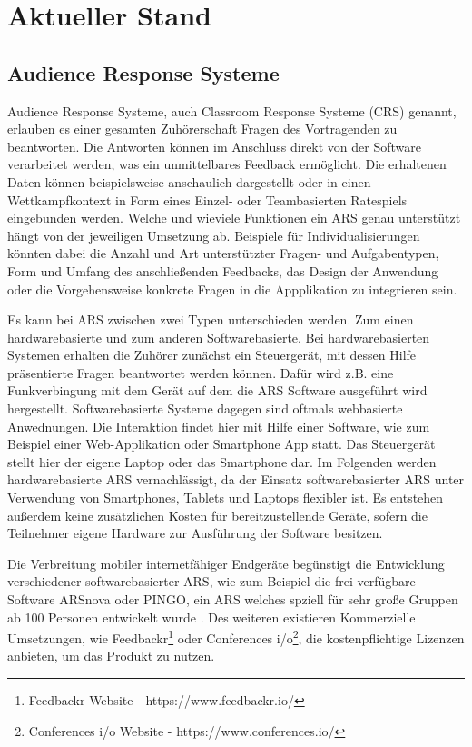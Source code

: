 \documentclass[conference]{IEEEtran}
\begin{document}
\section{Aktueller Stand}
\subsection{Audience Response Systeme}
Audience Response Systeme, auch Classroom Response Systeme (CRS) genannt, erlauben es einer gesamten Zuhörerschaft Fragen des Vortragenden zu beantworten. Die Antworten können im Anschluss direkt von der Software verarbeitet werden, was ein unmittelbares Feedback ermöglicht. Die erhaltenen Daten können beispielsweise anschaulich dargestellt oder in einen Wettkampfkontext in Form eines Einzel- oder Teambasierten Ratespiels eingebunden werden. Welche und wieviele Funktionen ein ARS genau unterstützt hängt von der jeweiligen Umsetzung ab. Beispiele für Individualisierungen könnten dabei die Anzahl und Art unterstützter Fragen- und Aufgabentypen, Form und Umfang des anschließenden Feedbacks, das Design der Anwendung oder die Vorgehensweise konkrete Fragen in die Appplikation zu integrieren sein. 

Es kann bei ARS zwischen zwei Typen unterschieden werden. Zum einen hardwarebasierte und zum anderen Softwarebasierte. Bei hardwarebasierten Systemen erhalten die Zuhörer zunächst ein Steuergerät, mit dessen Hilfe präsentierte Fragen beantwortet werden können. Dafür wird z.B. eine Funkverbingung mit dem Gerät auf dem die ARS Software ausgeführt wird hergestellt. 
Softwarebasierte Systeme dagegen sind oftmals webbasierte Anwednungen. Die Interaktion findet hier mit Hilfe einer Software, wie zum Beispiel einer Web-Applikation oder Smartphone App statt. Das Steuergerät stellt hier der eigene Laptop oder das Smartphone dar.
Im Folgenden werden hardwarebasierte ARS vernachlässigt, da der Einsatz softwarebasierter ARS unter Verwendung von Smartphones, Tablets und Laptops flexibler ist. \cite[p. 340]{Hobert2017} Es entstehen außerdem keine zusätzlichen Kosten für bereitzustellende Geräte, sofern die Teilnehmer eigene Hardware zur Ausführung der Software besitzen.

Die Verbreitung mobiler internetfähiger Endgeräte begünstigt die Entwicklung verschiedener softwarebasierter ARS, wie zum Beispiel die frei verfügbare Software ARSnova \cite{Quibeldey-Cirkel2013} oder PINGO, ein ARS welches spziell für sehr große Gruppen ab 100 Personen entwickelt wurde \cite{Reinhardt2012}. Des weiteren existieren Kommerzielle Umsetzungen, wie Feedbackr\footnote[3]{Feedbackr Website - https://www.feedbackr.io/} oder Conferences i/o\footnote[4]{Conferences i/o Website - https://www.conferences.io/}, die kostenpflichtige Lizenzen anbieten, um das Produkt zu nutzen.
\end{document}
